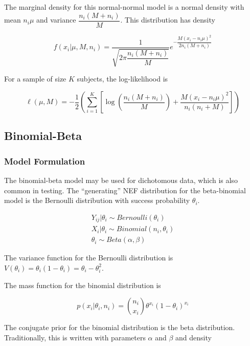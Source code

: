 \documentclass[12pt,epsfig]{article}
\begin{document}
The marginal density for this normal-normal model is a normal density with mean $n_i \mu$ and variance $\dfrac{n_i(M + n_i)}{M}$. This distribution has density

\begin{equation*}
    f(x_i | \mu, M, n_i) = \dfrac{1}{\sqrt{2 \pi \dfrac{n_i(M + n_i)}{M}}} e^{-\dfrac{M (x_i -  n_i \mu)^2}{2 n_i (M + n_i)}}
\end{equation*}

For a sample of size $K$ subjects, the log-likelihood is

\begin{equation*}
    \ell(\mu, M) = -\frac{1}{2} \left(\displaystyle \sum_{i = 1}^K \left[ \log\left(\dfrac{n_i(M + n_i)}{M}\right) + \dfrac{M (x_i -  n_i \mu)^2}{n_i (n_i + M)}\right] \right)
\end{equation*}

\subsection{Binomial-Beta}

\subsubsection{Model Formulation}

The binomial-beta model may be used for dichotomous data, which is also common in testing. The ``generating'' NEF distribution for the beta-binomial model is the Bernoulli distribution with success probability $\theta_i$.


\begin{gather*}
    Y_{ij} | \theta_i \sim Bernoulli(\theta_i)\\
    X_{i} | \theta_i \sim Binomial(n_i, \theta_i)\\
    \theta_i \sim Beta(\alpha, \beta)
\end{gather*}

\noindent The variance function for the Bernoulli distribution is $V(\theta_i) = \theta_i (1 - \theta_i) = \theta_i - \theta_i^2$. 

The mass function for the binomial distribution is

\begin{equation*}
    p(x_i | \theta_i, n_i) = {n_i \choose x_i} \theta^{x_i} (1-\theta_i)^{x_i} 
\end{equation*}

The conjugate prior for the binomial distribution is the beta distribution. Traditionally, this is written with parameters $\alpha$ and $\beta$ and density
\end{document}
